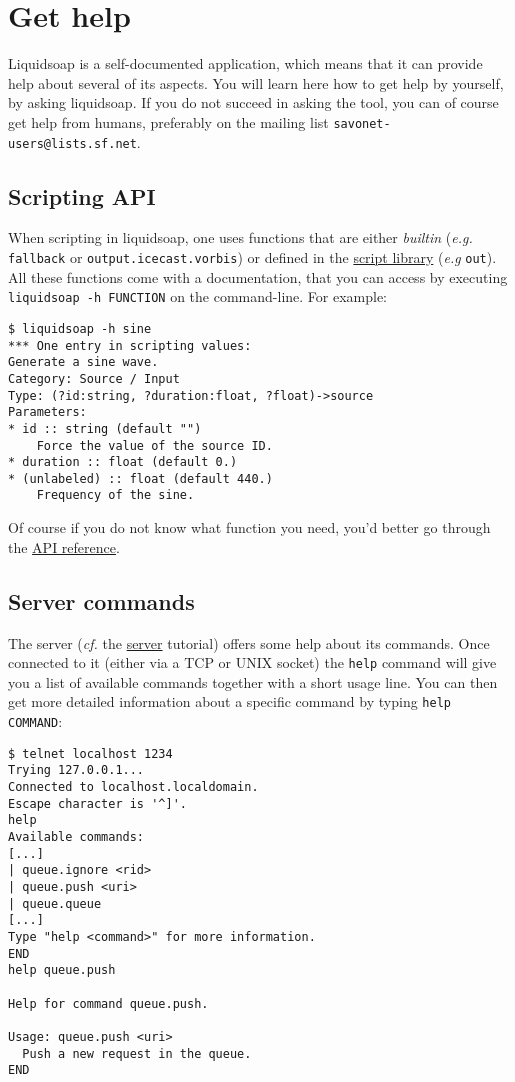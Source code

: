 \section{Get help}
Liquidsoap is a self-documented application,
which means that it can provide help about several of its aspects.
You will learn here how to get help by yourself, by asking liquidsoap.
If you do not succeed in asking the tool, you can of course get help from 
humans, preferably on the mailing list \verb+savonet-users@lists.sf.net+.

\subsection{Scripting API}
When scripting in liquidsoap, one uses functions that are either \emph{builtin}
(\emph{e.g.} \verb+fallback+ or \verb+output.icecast.vorbis+)
or defined in the \href{script_loading.html}{script library} (\emph{e.g} \verb+out+).
All these functions come with a documentation, that you can access by
executing \verb+liquidsoap -h FUNCTION+ on the command-line. For example:

\begin{verbatim}
$ liquidsoap -h sine
*** One entry in scripting values:
Generate a sine wave.
Category: Source / Input
Type: (?id:string, ?duration:float, ?float)->source
Parameters:
* id :: string (default "")
    Force the value of the source ID.
* duration :: float (default 0.)
* (unlabeled) :: float (default 440.)
    Frequency of the sine.
\end{verbatim}
Of course if you do not know what function you need, you'd better go 
through the \href{reference.html}{API reference}.

\subsection{Server commands}
The server (\emph{cf.} the \href{server.html}{server} tutorial)
offers some help about its commands.
Once connected to it (either via a TCP or UNIX socket) the \verb+help+ command will
give you a list of available commands together with a short usage line.
You can then get more detailed information about a specific command
by typing \verb+help COMMAND+:

\begin{verbatim}
$ telnet localhost 1234
Trying 127.0.0.1...
Connected to localhost.localdomain.
Escape character is '^]'.
help
Available commands:
[...]
| queue.ignore <rid>
| queue.push <uri>
| queue.queue
[...]
Type "help <command>" for more information.
END
help queue.push

Help for command queue.push.

Usage: queue.push <uri>
  Push a new request in the queue.
END
\end{verbatim}
